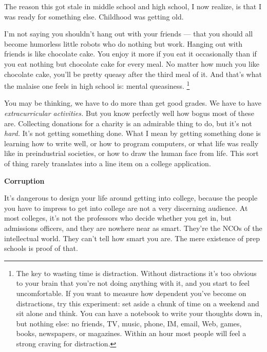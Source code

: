 \documentclass[12pt]{book}
\begin{document}
The reason this got stale in middle school and high school, I now
realize, is that I was ready for something else. Childhood was getting
old.

I'm not saying you shouldn't hang out with your friends --- that you
should all become humorless little robots who do nothing but work.
Hanging out with friends is like chocolate cake. You enjoy it more if
you eat it occasionally than if you eat nothing but chocolate cake for
every meal. No matter how much you like chocolate cake, you'll be pretty
queasy after the third meal of it. And that's what the malaise one feels
in high school is: mental queasiness. \footnote{The key to wasting time is distraction. Without distractions
it's too obvious to your brain that you're not doing anything with it,
and you start to feel uncomfortable. If you want to measure how
dependent you've become on distractions, try this experiment: set aside
a chunk of time on a weekend and sit alone and think. You can have a
notebook to write your thoughts down in, but nothing else: no friends,
TV, music, phone, IM, email, Web, games, books, newspapers, or
magazines. Within an hour most people will feel a strong craving for
distraction.}

You may be thinking, we have to do more than get good grades. We have to
have \emph{extracurricular activities.} But you know perfectly well how
bogus most of these are. Collecting donations for a charity is an
admirable thing to do, but it's not \emph{hard.} It's not getting
something done. What I mean by getting something done is learning how to
write well, or how to program computers, or what life was really like in
preindustrial societies, or how to draw the human face from life. This
sort of thing rarely translates into a line item on a college
application.

\textbf{Corruption}

It's dangerous to design your life around getting into college, because
the people you have to impress to get into college are not a very
discerning audience. At most colleges, it's not the professors who
decide whether you get in, but admissions officers, and they are nowhere
near as smart. They're the NCOs of the intellectual world. They can't
tell how smart you are. The mere existence of prep schools is proof of
that.
\end{document}

